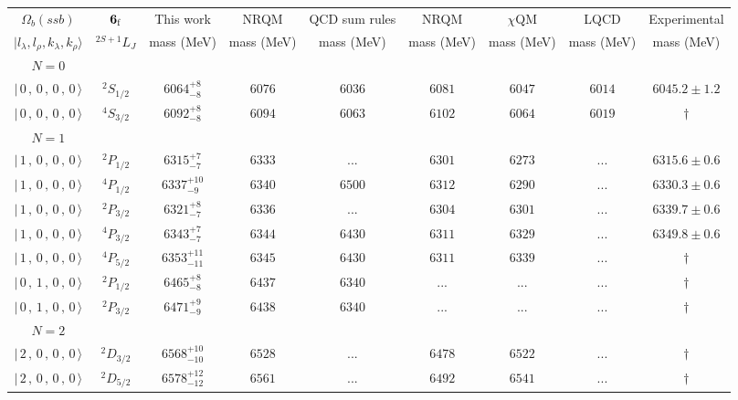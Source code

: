 \begin{tabular}{c c| c c c c c c c}\hline \hline
$\Omega_{b}(ssb)$& ${\bf {6}}_{\rm f}$& This work   &   NRQM \cite{Yoshida2015}     &  QCD sum rules \cite{Liu2008, Mao2015, Chen2016}      &  NRQM \cite{Roberts2008}    & $\chi$QM \cite{Kim2021}        & LQCD \cite{Mohanta2020}     & Experimental  \\ 
 $\vert l_{\lambda}, l_{\rho}, k_{\lambda}, k_{\rho} \rangle$ & $^{2S+1}L_{J}$ & mass (MeV)  &   mass (MeV)  &  mass (MeV)  &  mass (MeV) & mass (MeV) & mass (MeV) &      mass (MeV) \\ \hline
\hline
 $N=0$  &  &  &  &  &  \\ 
$\vert \,0\,,\,0\,,\,0\,,\,0 \,\rangle $ & $^{2}S_{1/2}$ & $6064^{+8}_{-8}$ & $6076$ & $6036$ & $6081$ & $6047$ & $6014$ & $6045.2\pm 1.2$ \\ 
$\vert \,0\,,\,0\,,\,0\,,\,0 \,\rangle $ & $^{4}S_{3/2}$ & $6092^{+8}_{-8}$ & $6094$ & $6063$ & $6102$ & $6064$ & $6019$ & $\dagger$ \\ 
\hline
 $N=1$  &  &  &  &  &  \\ 
$\vert \,1\,,\,0\,,\,0\,,\,0 \,\rangle $ & $^{2}P_{1/2}$ & $6315^{+7}_{-7}$ & $6333$ & ... & $6301$ & $6273$ & ... & $6315.6\pm 0.6$ \\ 
$\vert \,1\,,\,0\,,\,0\,,\,0 \,\rangle $ & $^{4}P_{1/2}$ & $6337^{+10}_{-9}$ & $6340$ & $6500$ & $6312$ & $6290$ & ... & $6330.3\pm 0.6$ \\ 
$\vert \,1\,,\,0\,,\,0\,,\,0 \,\rangle $ & $^{2}P_{3/2}$ & $6321^{+8}_{-7}$ & $6336$ & ... & $6304$ & $6301$ & ... & $6339.7\pm 0.6$ \\ 
$\vert \,1\,,\,0\,,\,0\,,\,0 \,\rangle $ & $^{4}P_{3/2}$ & $6343^{+7}_{-7}$ & $6344$ & $6430$ & $6311$ & $6329$ & ... & $6349.8\pm 0.6$ \\ 
$\vert \,1\,,\,0\,,\,0\,,\,0 \,\rangle $ & $^{4}P_{5/2}$ & $6353^{+11}_{-11}$ & $6345$ & $6430$ & $6311$ & $6339$ & ... & $\dagger$ \\ 
$\vert \,0\,,\,1\,,\,0\,,\,0 \,\rangle $ & $^{2}P_{1/2}$ & $6465^{+8}_{-8}$ & $6437$ & $6340$ & ... & ... & ... & $\dagger$ \\ 
$\vert \,0\,,\,1\,,\,0\,,\,0 \,\rangle $ & $^{2}P_{3/2}$ & $6471^{+9}_{-9}$ & $6438$ & $6340$ & ... & ... & ... & $\dagger$ \\ 
\hline
 $N=2$  &  &  &  &  &  \\ 
$\vert \,2\,,\,0\,,\,0\,,\,0 \,\rangle $ & $^{2}D_{3/2}$ & $6568^{+10}_{-10}$ & $6528$ & ... & $6478$ & $6522$ & ... & $\dagger$ \\ 
$\vert \,2\,,\,0\,,\,0\,,\,0 \,\rangle $ & $^{2}D_{5/2}$ & $6578^{+12}_{-12}$ & $6561$ & ... & $6492$ & $6541$ & ... & $\dagger$ \\ 

\end{tabular}
